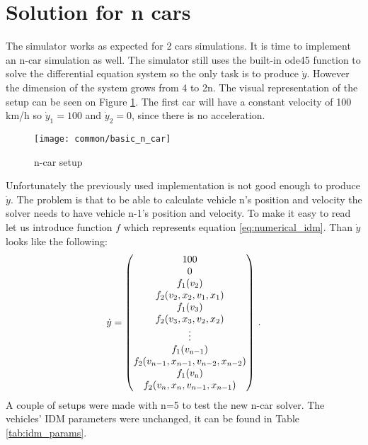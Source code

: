 	\section{Solution for n cars}
		The simulator works as expected for 2 cars simulations. It is time to implement an n-car simulation as well. The simulator still uses the built-in ode45 function to solve the differential equation system so the only task is to produce $\dot{y}$. However the dimension of the system grows from 4 to 2n. The visual representation of the setup can be seen on Figure \ref{fig:basic_n_car}. The first car will have a constant velocity of 100 km/h so $\dot{y}_1 = 100$ and $\dot{y}_2 = 0$, since there is no acceleration.
		\begin{figure}[ht]
			\centering
			\texttt{[image: common/basic\_n\_car]}
			\caption{n-car setup}
			\label{fig:basic_n_car}
		\end{figure}
		Unfortunately the previously used implementation is not good enough to produce $\dot{y}$. The problem is  that to be able to calculate vehicle n's position and velocity the solver needs to have vehicle n-1's position and velocity. To make it easy to read let us introduce function $f$ which represents equation \ref{eq:numerical_idm}. Than $\dot{y}$ looks like the following:
		\begin{equation}
			\dot{y}=
			\begin{pmatrix}
				100\\
				0\\
				f_1(v_{2})\\
				f_2(v_{2}, x_{2},v_{1}, x_{1})\\
				f_1(v_{3})\\
				f_2(v_{3}, x_{3},v_{2}, x_{2})\\
				\vdots\\
				f_1(v_{\rm n-1})\\
				f_2(v_{n-1}, x_{n-1},v_{n-2}, x_{n-2})\\
				f_1(v_{\rm n})\\
				f_2(v_{n}, x_{n},v_{n-1}, x_{n-1})
			\end{pmatrix}\,.
			\label{eq:n_ode_math}
		\end{equation}
		A couple of setups were made with n=5 to test the new n-car solver. The vehicles' IDM parameters were unchanged, it can be found in Table \ref{tab:idm_params}.
